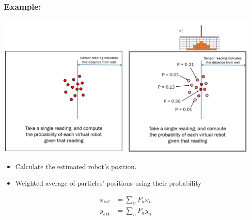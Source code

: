 \documentclass[10pt]{article}
\begin{document}
\subsubsection*{Example:}
\begin{center} 
	\includegraphics*[width=\textwidth]{L1_11.png} 
\end{center}
\begin{itemize}
	\item Calculate the estimated robot's position.
	\item Weighted average of particles' positions using their probability
\end{itemize}
\begin{align*}
    x_{est} &= \sum_n P_n x_n\\
    y_{est} &= \sum_n P_n y_n
\end{align*}
\end{document}
